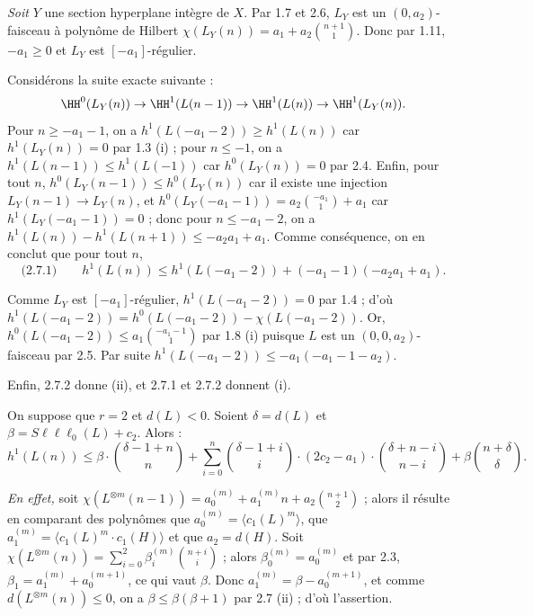 \noindent\textit{Soit} $Y$ une section hyperplane intègre de $X$. Par 1.7 et 2.6, $L_Y$ est un $(0, a_2)$-faisceau à polynôme de Hilbert $\chi(L_Y(n)) = a_1 + a_2 \binom{n+1}{1}$. Donc par 1.11, $-a_1 \geq 0$ et $L_Y$ est $[-a_1]$-régulier.

Considérons la suite exacte suivante :
\[
\HH^0(L_Y(n)) \to \HH^1(L(n-1)) \to \HH^1(L(n)) \to \HH^1(L_Y(n)).
\]
Pour $n \geq -a_1-1$, on a $h^1(L(-a_1-2)) \geq h^1(L(n))$ car $h^1(L_Y(n)) = 0$ par 1.3 (i) ; pour $n \leq -1$, on a $h^1(L(n-1)) \leq h^1(L(-1))$ car $h^0(L_Y(n)) = 0$ par 2.4. Enfin, pour tout $n$, $h^0(L_Y(n-1)) \leq h^0(L_Y(n))$ car il existe une injection $L_Y(n-1) \to L_Y(n)$, et $h^0(L_Y(-a_1-1)) = a_2 \binom{-a_1}{1} + a_1$ car $h^1(L_Y(-a_1-1)) = 0$ ; donc pour $n \leq -a_1-2$, on a $h^1(L(n)) - h^1(L(n+1)) \leq -a_2 a_1 + a_1$. Comme conséquence, on en conclut que pour tout $n$,
\[
\text{(2.7.1)} \qquad h^1(L(n)) \leq h^1(L(-a_1-2)) + (-a_1-1)(-a_2 a_1 + a_1).
\]

\noindent
Comme $L_Y$ est $[-a_1]$-régulier, $h^1(L(-a_1-2)) = 0$ par 1.4 ; d'où $h^1(L(-a_1-2)) = h^0(L(-a_1-2)) - \chi(L(-a_1-2))$. Or, $h^0(L(-a_1-2)) \leq a_1 \binom{-a_1-1}{1}$ par 1.8 (i) puisque $L$ est un $(0, 0, a_2)$-faisceau par 2.5. Par suite $h^1(L(-a_1-2)) \leq -a_1(-a_1-1-a_2)$.

Enfin, 2.7.2 donne (ii), et 2.7.1 et 2.7.2 donnent (i).

\begin{lem}\label{lem:2.8} On suppose que $r=2$ et $d(L) < 0$. Soient $\delta = d(L)$ et $\beta = S\ell\ell\ell_0(L) + c_2$. Alors :
\[
h^1(L(n)) \leq \beta \cdot \binom{\delta-1+n}{n} + \sum_{i=0}^{n} \binom{\delta-1+i}{i} \cdot (2c_2 - a_1) \cdot \binom{\delta+n-i}{n-i} + \beta \binom{n+\delta}{\delta}.
\]
\end{lem}

\noindent\textit{En effet,} soit $\chi(L^{\otimes m}(n-1)) = a_0^{(m)} + a_1^{(m)}n + a_2 \binom{n+1}{2}$ ; alors il résulte en comparant des polynômes que $a_0^{(m)} = \langle c_1(L)^m \rangle$, que $a_1^{(m)} = \langle c_1(L)^m \cdot c_1(H) \rangle$ et que $a_2 = d(H)$. Soit $\chi(L^{\otimes m}(n)) = \sum_{i=0}^{2} \beta_i^{(m)} \binom{n+i}{i}$ ; alors $\beta_0^{(m)} = a_0^{(m)}$ et par 2.3, $\beta_1 = a_1^{(m)} + a_0^{(m+1)}$, ce qui vaut $\beta$. Donc $a_1^{(m)} = \beta - a_0^{(m+1)}$, et comme $d(L^{\otimes m}(n)) \leq 0$, on a $\beta \leq \beta(\beta+1)$ par 2.7 (ii) ; d'où l'assertion.

